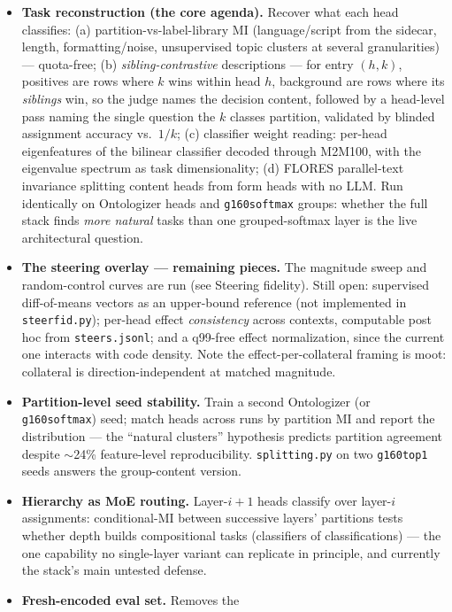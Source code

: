 \documentclass[11pt]{article}
\begin{document}
\begin{itemize}
\item \textbf{Task reconstruction (the core agenda).} Recover what each
head classifies: (a) partition-vs-label-library MI (language/script from
the sidecar, length, formatting/noise, unsupervised topic clusters at
several granularities) --- quota-free; (b) \emph{sibling-contrastive}
descriptions --- for entry $(h,k)$, positives are rows where $k$ wins
within head $h$, background are rows where its \emph{siblings} win, so
the judge names the decision content, followed by a head-level pass
naming the single question the $k$ classes partition, validated by
blinded assignment accuracy vs.\ $1/k$; (c) classifier weight reading:
per-head eigenfeatures of the bilinear classifier decoded through M2M100,
with the eigenvalue spectrum as task dimensionality; (d) FLORES
parallel-text invariance splitting content heads from form heads with no
LLM. Run identically on Ontologizer heads and \texttt{g160softmax}
groups: whether the full stack finds \emph{more natural} tasks than one
grouped-softmax layer is the live architectural question.
\item \textbf{The steering overlay --- remaining pieces.} The magnitude
sweep and random-control curves are run (see Steering fidelity). Still
open: supervised diff-of-means vectors as an upper-bound reference (not
implemented in \texttt{steerfid.py}); per-head effect \emph{consistency}
across contexts, computable post hoc from \texttt{steers.jsonl}; and a
q99-free effect normalization, since the current one interacts with code
density. Note the effect-per-collateral framing is moot: collateral is
direction-independent at matched magnitude.
\item \textbf{Partition-level seed stability.} Train a second Ontologizer
(or \texttt{g160softmax}) seed; match heads across runs by partition MI
and report the distribution --- the ``natural clusters'' hypothesis
predicts partition agreement despite $\sim$24\% feature-level
reproducibility. \texttt{splitting.py} on two \texttt{g160top1} seeds
answers the group-content version.
\item \textbf{Hierarchy as MoE routing.} Layer-$i{+}1$ heads classify
over layer-$i$ assignments: conditional-MI between successive layers'
partitions tests whether depth builds compositional tasks (classifiers of
classifications) --- the one capability no single-layer variant can
replicate in principle, and currently the stack's main untested defense.
\item \textbf{Fresh-encoded eval set.} Removes the

\end{itemize}
\end{document}

